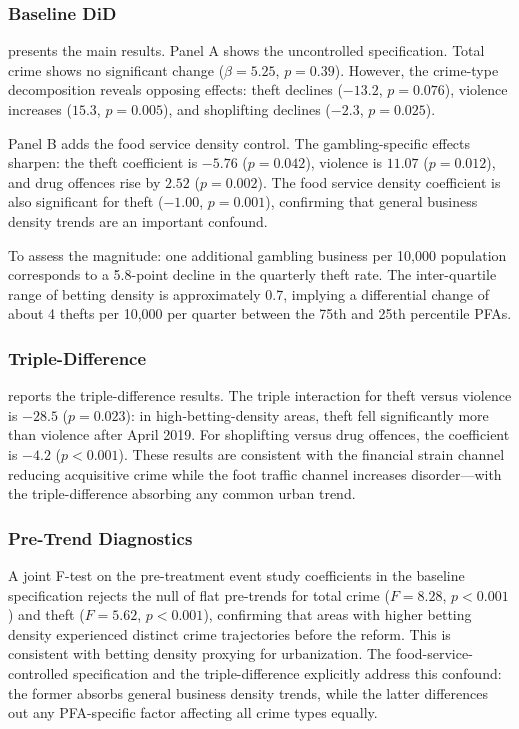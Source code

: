 \documentclass[12pt]{article}
\begin{document}
\subsubsection*{Baseline DiD}  presents the main results. Panel A shows the uncontrolled specification. Total crime shows no significant change ($\beta = 5.25$, $p = 0.39$). However, the crime-type decomposition reveals opposing effects: theft declines ($-13.2$, $p = 0.076$), violence increases ($15.3$, $p = 0.005$), and shoplifting declines ($-2.3$, $p = 0.025$).

Panel B adds the food service density control. The gambling-specific effects sharpen: the theft coefficient is $-5.76$ ($p = 0.042$), violence is $11.07$ ($p = 0.012$), and drug offences rise by $2.52$ ($p = 0.002$). The food service density coefficient is also significant for theft ($-1.00$, $p = 0.001$), confirming that general business density trends are an important confound.

To assess the magnitude: one additional gambling business per 10,000 population corresponds to a 5.8-point decline in the quarterly theft rate. The inter-quartile range of betting density is approximately 0.7, implying a differential change of about 4 thefts per 10,000 per quarter between the 75th and 25th percentile PFAs.

\subsubsection*{Triple-Difference}  reports the triple-difference results. The triple interaction for theft versus violence is $-28.5$ ($p = 0.023$): in high-betting-density areas, theft fell significantly more than violence after April 2019. For shoplifting versus drug offences, the coefficient is $-4.2$ ($p < 0.001$). These results are consistent with the financial strain channel reducing acquisitive crime while the foot traffic channel increases disorder---with the triple-difference absorbing any common urban trend.

\subsubsection*{Pre-Trend Diagnostics} A joint F-test on the pre-treatment event study coefficients in the baseline specification rejects the null of flat pre-trends for total crime ($F = 8.28$, $p < 0.001$) and theft ($F = 5.62$, $p < 0.001$), confirming that areas with higher betting density experienced distinct crime trajectories before the reform. This is consistent with betting density proxying for urbanization. The food-service-controlled specification and the triple-difference explicitly address this confound: the former absorbs general business density trends, while the latter differences out any PFA-specific factor affecting all crime types equally.
\end{document}
